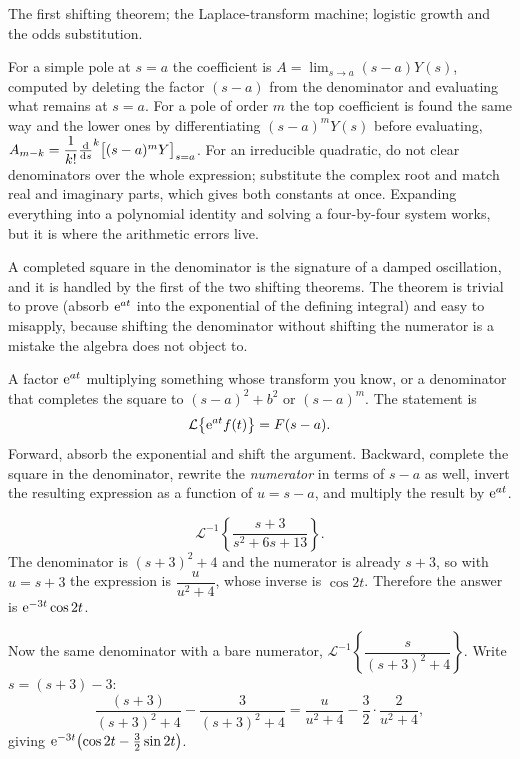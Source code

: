 \begin{seealsob}The first shifting theorem; the Laplace-transform machine; logistic growth and the odds substitution.\end{seealsob}

\begin{keynote}
For a simple pole at $s=a$ the coefficient is $A=\lim_{s\to a}(s-a)Y(s)$, computed by deleting the factor $(s-a)$ from the denominator and evaluating what remains at $s=a$. For a pole of order $m$ the top coefficient is found the same way and the lower ones by differentiating $(s-a)^{m}Y(s)$ before evaluating, $A_{m-k}=\dfrac{1}{k!}\frac{\mathrm{d}}{\mathrm{d}s}^{k}\bigl[(s-a)^{m}Y\bigr]_{s=a}$. For an irreducible quadratic, do not clear denominators over the whole expression; substitute the complex root and match real and imaginary parts, which gives both constants at once. Expanding everything into a polynomial identity and solving a four-by-four system works, but it is where the arithmetic errors live.
\end{keynote}

A completed square in the denominator is the signature of a damped oscillation, and it is handled by the first of the two shifting theorems. The theorem is trivial to prove (absorb $\mathrm{e}^{at}$ into the exponential of the defining integral) and easy to misapply, because shifting the denominator without shifting the numerator is a mistake the algebra does not object to.

\cue A factor $\mathrm{e}^{at}$ multiplying something whose transform you know, or a denominator that completes the square to $(s-a)^{2}+b^{2}$ or $(s-a)^{m}$.
\method The statement is
\[\mathcal{L}\bigl\{\mathrm{e}^{at}f(t)\bigr\}=F(s-a).\]
Forward, absorb the exponential and shift the argument. Backward, complete the square in the denominator, rewrite the \emph{numerator} in terms of $s-a$ as well, invert the resulting expression as a function of $u=s-a$, and multiply the result by $\mathrm{e}^{at}$.

\begin{worked}
\[\mathcal{L}^{-1}\left\{\frac{s+3}{s^{2}+6s+13}\right\}.\]
The denominator is $(s+3)^{2}+4$ and the numerator is already $s+3$, so with $u=s+3$ the expression is $\dfrac{u}{u^{2}+4}$, whose inverse is $\cos2t$. Therefore the answer is $\mathrm{e}^{-3t}\cos2t$.

Now the same denominator with a bare numerator, $\mathcal{L}^{-1}\left\{\dfrac{s}{(s+3)^{2}+4}\right\}$. Write $s=(s+3)-3$:
\[\frac{(s+3)}{(s+3)^{2}+4}-\frac{3}{(s+3)^{2}+4}
=\frac{u}{u^{2}+4}-\frac32\cdot\frac{2}{u^{2}+4},\]
giving $\mathrm{e}^{-3t}\bigl(\cos2t-\tfrac32\sin2t\bigr)$.
\end{worked}

